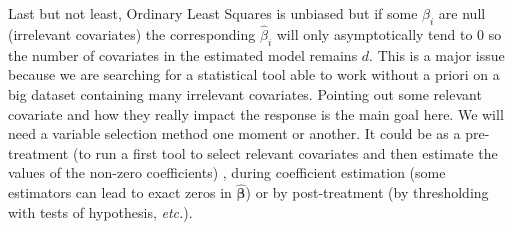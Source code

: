 \documentclass[12pt,a4paper]{report}
\begin{document}
	Last but not least, Ordinary Least Squares is unbiased but if some $\beta_i$ are null (irrelevant covariates) the corresponding $\hat{\beta}_i$ will only asymptotically tend to 0 so the number of covariates in the estimated model remains $d$. This is a major issue because we are searching for a statistical tool able to work without a priori on a big dataset containing many irrelevant covariates. Pointing out some relevant covariate and how they really impact the response is the main goal here. We will need a variable selection method one moment or another. It could be as a pre-treatment (to run a first tool to select relevant covariates and then estimate the values of the non-zero coefficients) , during coefficient estimation (some estimators can lead to exact zeros in $\hat{\boldsymbol{\beta}}$) or by post-treatment (by thresholding with tests of hypothesis, {\it etc.}). \\
\\	
	\\
%	
	
\end{document}
